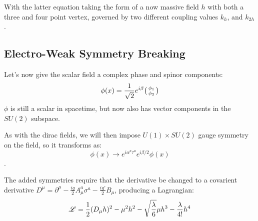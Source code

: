         With the latter equation taking the form of a now massive field $h$ with both a three and four point vertex,
            governed by two different coupling values $k_{h}$, and $k_{2h}$.

        \cite{Halzen_book}

        

    \subsection{Electro-Weak Symmetry Breaking}

        Let's now give the scalar field a complex phase and spinor components:
        \begin{equation}
            \phi(x) = \frac{1}{\sqrt{2}} e^{i \beta} \big(\begin{smallmatrix} \phi_1 \\ \phi_2 \end{smallmatrix}\big)
        \end{equation}
        $\phi$ is still a scalar in spacetime, but now also has vector components in the $SU(2)$ subspace.

        As with the dirac fields, we will then impose $U(1) \times SU(2)$ gauge symmetry on the field, so it transforms as:
        \begin{equation}
            \phi(x) \rightarrow e^{i \alpha^a \tau^a} e^{i \beta/2 } \phi(x)
        \end{equation}.

        The added symmetries require that the derivative be changed to a covarient derivative 
            $D^{\mu} = \partial^{\mu} - \frac{ig}{2} A^a_{\mu} \sigma^a - \frac{ig'}{2} B_{\mu}$,
            producing a Lagrangian:
        \begin{equation} \begin{split}
            \mathscr{L} & = \frac{1}{2} (D_{\mu} h)^2
                - \mu^2 h^2
                -\sqrt{\frac{\lambda}{6}} \mu h^3
                - \frac{\lambda}{4!} h^4 \\
        \end{split} \end{equation}

